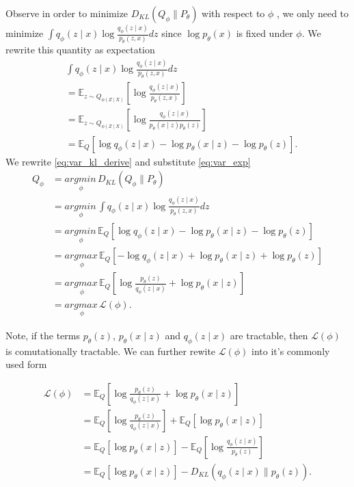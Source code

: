 \documentclass[11pt]{article}
\theoremstyle{plain}
\theoremstyle{definition}
\theoremstyle{plain}
\begin{document}
\noindent Observe in order to minimize $D_{KL}(Q_{\phi}\rVert P_{\theta})$
with respect to $\phi$ , we only need to minimize $\int q_{\phi}(z\mid x)\log\frac{q_{\phi}(z\mid x)}{p_{\theta}(z,x)}dz$
since $\log p_{\theta}(x)$ is fixed under $\phi$. We rewrite this
quantity as expectation
\begin{equation}
\begin{aligned} & \int q_{\phi}(z\mid x)\log\frac{q_{\phi}(z\mid x)}{p_{\theta}(z,x)}dz\\
 & =\mathbb{E}_{z\sim Q_{\phi(Z\mid X)}}\left[\log\frac{q_{\phi}(z\mid x)}{p_{\theta}(z,x)}\right]\\
 & =\mathbb{E}_{z\sim Q_{\phi(Z\mid X)}}\left[\log\frac{q_{\phi}(z\mid x)}{p_{\theta}(x\mid z)p_{\theta}(z)}\right]\\
 & =\mathbb{E}_{Q}\left[\log q_{\phi}(z\mid x)-\log p_{\theta}(x\mid z)-\log p_{\theta}(z)\right].
\end{aligned}
\label{eq:var_exp}
\end{equation}
We rewrite \eqref{eq:var_kl_derive} and substitute \eqref{eq:var_exp}
\begin{equation}
\begin{aligned}Q_{\phi} & =\underset{\phi}{argmin\,}D_{KL}(Q_{\phi}\rVert P_{\theta})\\
 & =\underset{\phi}{argmin\,}\int q_{\phi}(z\mid x)\log\frac{q_{\phi}(z\mid x)}{p_{\theta}(z,x)}dz\\
 & =\underset{\phi}{argmin\,}\mathbb{E}_{Q}\left[\log q_{\phi}(z\mid x)-\log p_{\theta}(x\mid z)-\log p_{\theta}(z)\right]\\
 & =\underset{\phi}{argmax\,}\mathbb{E}_{Q}\left[-\log q_{\phi}(z\mid x)+\log p_{\theta}(x\mid z)+\log p_{\theta}(z)\right]\\
 & =\underset{\phi}{argmax\,}\mathbb{E}_{Q}\left[\log\frac{p_{\theta}(z)}{q_{\phi}(z\mid x)}+\log p_{\theta}(x\mid z)\right]\\
 & =\underset{\phi}{argmax\,}\mathcal{L}(\phi).
\end{aligned}
\end{equation}

\noindent Note, if the terms $p_{\theta}(z)$, $p_{\theta}(x\mid z)$
and $q_{\phi}(z\mid x)$ are tractable, then $\mathcal{L}(\phi)$
is comutationally tractable. We can further rewite $\mathcal{L}(\phi)$
into it's commonly used form

\begin{equation}
\begin{aligned}\mathcal{L}(\phi) & =\mathbb{E}_{Q}\left[\log\frac{p_{\theta}(z)}{q_{\phi}(z\mid x)}+\log p_{\theta}(x\mid z)\right]\\
 & =\mathbb{E}_{Q}\left[\log\frac{p_{\theta}(z)}{q_{\phi}(z\mid x)}\right]+\mathbb{E}_{Q}\left[\log p_{\theta}(x\mid z)\right]\\
 & =\mathbb{E}_{Q}\left[\log p_{\theta}(x\mid z)\right]-\mathbb{E}_{Q}\left[\log\frac{q_{\phi}(z\mid x)}{p_{\theta}(z)}\right]\\
 & =\mathbb{E}_{Q}\left[\log p_{\theta}(x\mid z)\right]-D_{KL}\left(q_{\phi}(z\mid x)\rVert p_{\theta}(z)\right).
\end{aligned}
\label{eq:var_elbo}
\end{equation}
\end{document}
